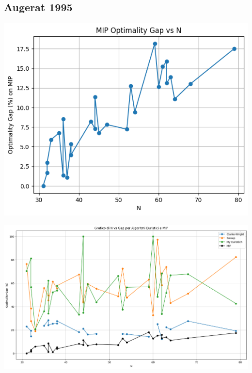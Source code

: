 \documentclass[compress]{beamer}
\begin{document}
\subsection{Augerat 1995}
\begin{frame}{\subsecname}
    \begin{center}
		\begin{minipage}{1\textwidth}
            \centering
            \includegraphics[width=0.75\linewidth]{images/MIP.png}
        \end{minipage}
    \end{center}
\end{frame}

\begin{frame}{\subsecname}
    \begin{center}
		\begin{minipage}{1\textwidth}
            \centering
            \includegraphics[width=1\linewidth]{images/N_gap.png}
        \end{minipage}
    \end{center}
\end{frame}
\end{document}
